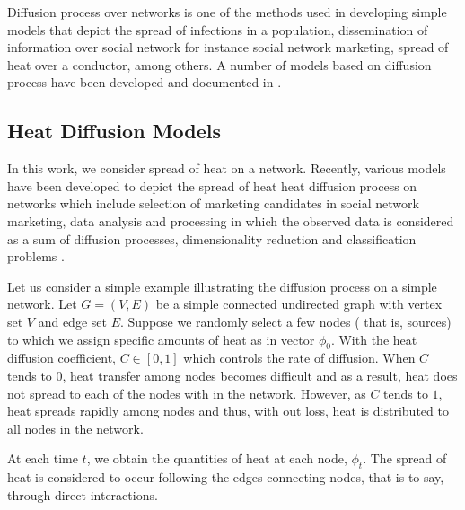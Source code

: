 \documentclass[10pt,a4paper]{article}
\begin{document}
    Diffusion process over networks is one of the methods used in developing simple models that depict the spread of infections in a population, dissemination of information over social network for instance social network marketing, spread of heat over a conductor, among others. A number of models based on diffusion process have been developed and documented in \citep{estrada2011epidemic,kasprzak2012diffusion,lopez2008diffusion}.
    
    \subsection{Heat Diffusion Models}
    In this work, we consider spread of heat on a network. Recently, various models have been developed to depict the spread of heat heat diffusion process on networks which include selection of marketing candidates in social network marketing, data analysis and processing in which the observed data is considered as a sum of diffusion processes, dimensionality reduction and classification problems   \citep{ma2008mining,thanou2017learning,belkin2003laplacian}.
    
    Let us consider a simple example illustrating the diffusion process on a simple network. Let $G=(V,E)$ be a simple connected undirected graph with vertex set $V$ and edge set $E$. Suppose we randomly select a few nodes ( that is, sources) to which we assign specific amounts of heat as in vector $\phi_0$. With the heat diffusion coefficient, $C \in [0,1]$ which controls the rate of diffusion. When $C$ tends to $0$, heat transfer among nodes becomes difficult and as a result, heat does not spread to each of the nodes with in the network. However, as $C$ tends to $1$, heat spreads rapidly among nodes and thus, with out loss, heat is distributed to all nodes in the network.
    
   At each time $t$, we obtain the quantities of heat at each node, $\phi_t$. The spread of heat is considered to occur following the edges connecting nodes, that is to say, through direct interactions.  
    	
\end{document}

